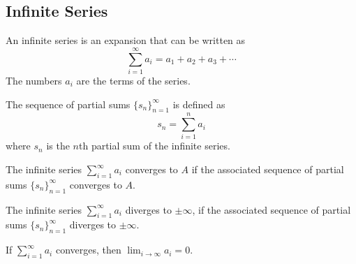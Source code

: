 \documentclass{article}
\begin{document}
\subsection{Infinite Series}
\begin{multicols}{2}
    \begin{definition}
        An infinite series is an expansion that can be written as
        \begin{equation*}
            \sum_{i=1}^\infty a_i = a_1 + a_2 + a_3 + \cdots
        \end{equation*}
        The numbers $a_i$ are the terms of the series.
    \end{definition}
    \begin{definition}
        The sequence of partial sums $\{s_n\}_{n=1}^\infty$ is defined as
        \begin{equation*}
            s_n = \sum_{i=1}^n a_i
        \end{equation*}
        where $s_n$ is the $n$th partial sum of the infinite series.
    \end{definition}
    \columnbreak
    \begin{definition}
        The infinite series $\sum_{i=1}^\infty a_i$ converges to $A$ if the associated sequence of partial sums $\{s_n\}_{n=1}^\infty$ converges to $A$.
    \end{definition}
    \begin{definition}
        The infinite series $\sum_{i=1}^\infty a_i$ diverges to $\pm\infty$, if the associated sequence of partial sums $\{s_n\}_{n=1}^\infty$ diverges to $\pm\infty$.
    \end{definition}
    \begin{theorem}
        If $\sum_{i=1}^{\infty}a_i$ converges, then $\lim_{i\to\infty}a_i=0$.
    \end{theorem}
\end{multicols}
%
\end{document}
